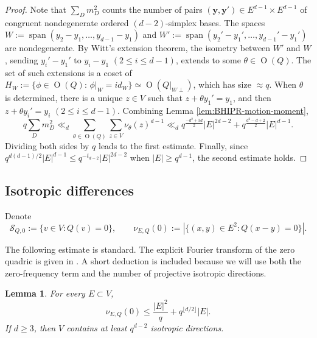 \documentclass[11pt]{article}
\newtheorem{lemma}[theorem]{Lemma}
\theoremstyle{remark}
\numberwithin{equation}{section}
\newcommand{\Orth}{\operatorname O}
\newcommand{\Span}{\operatorname{span}}
\newcommand{\1}{\mathbf 1}
\begin{document}
\begin{proof}
Note that $\sum_D m_D^2$ counts the number of pairs $(\mathbf y,\mathbf y')\in E^{d-1}\times E^{d-1}$ of congruent nondegenerate ordered $(d-2)$-simplex bases. The spaces $W:=\Span(y_2-y_1,\ldots,y_{d-1}-y_1)$ and $W':=\Span(y_2'-y_1',\ldots,y_{d-1}'-y_1')$ are nondegenerate. By Witt's extension theorem, the isometry between $W'$ and $W$, sending $y_i'-y_1'$ to $y_i-y_1$ $(2\leq i\leq d-1)$, extends to some $\theta\in \Orth(Q)$. The set of such extensions is a coset of $H_W:=\{\phi\in \Orth(Q):\, \phi|_W=id_W\}\simeq \Orth(Q|_{W\perp})$, which has size \(\approx q\). When $\theta$ is determined, there is a unique $z\in V$ such that $z+\theta y_1'= y_1$, and then $z+\theta y_i'= y_i$ $(2\leq i\leq d-1)$. Combining Lemma \ref{lem:BHIPR-motion-moment}, 
\[
q\sum_Dm_D^2 \ll_d \sum_{\theta\in\Orth(Q)}\sum_{z\in V}\nu_\theta(z)^{d-1} \ll_d q^{\frac{-d^2+3d}{2}}|E|^{2d-2}
+
q^{\frac{d^2-d+2}{2}}|E|^{d-1}.
\]
Dividing both sides by $q$ leads to the first estimate. Finally, since $q^{d(d-1)/2}|E|^{d-1} \le q^{-t_{d-2}}|E|^{2d-2}$ when \(|E|\ge q^{d-1}\), the second estimate holds.
\end{proof}



\subsection{Isotropic differences}

Denote
\[
\mathcal S_{Q,0}:=\{v\in V:Q(v)=0\},\qquad \nu_{E,Q}(0):=|\{(x,y)\in E^2:Q(x-y)=0\}|. 
\]

The following estimate is standard.  The explicit Fourier transform of the zero quadric is given in \cite[Lemma~4.1]{KohShenExtension}.  A short deduction is included because we will use both the zero-frequency term and the number of
projective isotropic directions.

\begin{lemma}
\label{lem:isotropic-differences}
For every \(E\subset V\),
\[
\nu_{E,Q}(0)   \le  \frac{|E|^2}{q}+q^{\lfloor d/2\rfloor}|E|.
\]
If \(d\ge3\), then \(V\) contains at least \(q^{d-2}\) isotropic
directions.
\end{lemma}
\end{document}
